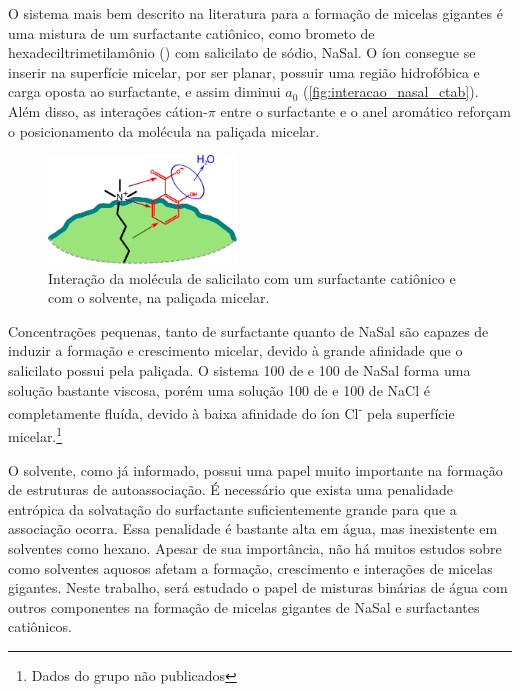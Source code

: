 	O sistema mais bem descrito na literatura para a formação de micelas gigantes é uma mistura de um surfactante catiônico, como brometo de hexadeciltrimetilamônio (\CTAB) com salicilato de sódio, NaSal.\cite{Dreiss2007} O íon \Sal{} consegue se inserir na superfície micelar, por ser planar, possuir uma região hidrofóbica e carga oposta ao surfactante, e assim diminui \(a_0\) (\autoref{fig:interacao_nasal_ctab}).\cite{Ito2014c} Além disso, as interações cátion-\(\pi\) entre o surfactante e o anel aromático\cite{Mahadevi2013a, Umeasiegbu2016} reforçam o posicionamento da molécula na paliçada micelar.  
	
	\begin{figure}[h]
		\centering
		\includegraphics[width=5cm]{imagens/introducao/interacao_nasal_ctab}
		\caption{Interação da molécula de salicilato com um surfactante catiônico e com o solvente, na paliçada micelar.}
		\label{fig:interacao_nasal_ctab} 
	\end{figure}
	
	Concentrações pequenas, tanto de surfactante quanto de NaSal são capazes de induzir a formação e crescimento micelar\cite{Sarac2013, Ito2015c}, devido à grande afinidade que o salicilato possui pela paliçada. O sistema 100 \mM{} de \CTAB{} e 100 \mM{} de NaSal forma uma solução bastante viscosa, porém uma solução 100 \mM{} de \CTAB{} e 100 \mM{} de NaCl é completamente fluída, devido à baixa afinidade do íon Cl\textsuperscript{-} pela superfície micelar.\footnote{Dados do grupo não publicados} 
	
	O solvente, como já informado, possui uma papel muito importante na formação de estruturas de autoassociação. É necessário que exista uma penalidade entrópica da solvatação do surfactante suficientemente grande para que a associação ocorra. Essa penalidade é bastante alta em água, mas inexistente em solventes como hexano. Apesar de sua importância, não há muitos estudos sobre como solventes aquosos afetam a formação, crescimento e interações de micelas gigantes. Neste trabalho, será estudado o papel de misturas binárias de água com outros componentes na formação de micelas gigantes de NaSal e surfactantes catiônicos.
		
